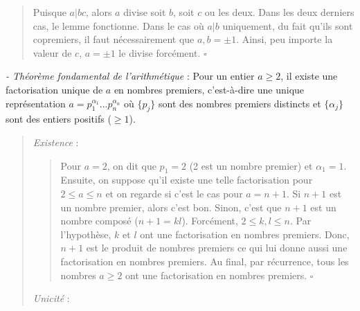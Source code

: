 \begin{quote}
    Puisque $a|bc$, alors $a$ divise soit $b$, soit $c$ ou les deux. Dans les deux derniers cas, le lemme fonctionne. Dans le cas où $a|b$ uniquement, du fait qu'ils sont copremiers, il faut nécessairement que $a,b = \pm 1$. Ainsi, peu importe la valeur de $c$, $a = \pm 1$ le divise forcément. $\square$
\end{quote}

\textit{- Théorème fondamental de l'arithmétique} : Pour un entier $a \geq 2$, il existe une factorisation unique de $a$ en nombres premiers, c'est-à-dire une unique représentation $a = p_1^{\alpha_1}...p_n^{\alpha_n}$ où $\{p_j\}$ sont des nombres premiers distincts et $\{\alpha_j\}$ sont des entiers positifs ($\geq 1$).

\begin{quote}

    \textit{Existence} :

    \begin{quote}
        Pour $a=2$, on dit que $p_1 = 2$ (2 est un nombre premier) et $\alpha_1 = 1$. Ensuite, on suppose qu'il existe une telle factorisation pour $2 \leq a \leq n$ et on regarde si c'est le cas pour $a = n+1$. Si $n+1$ est un nombre premier, alors c'est bon. Sinon, c'est que $n+1$ est un nombre composé ($n+1 = kl$). Forcément, $2 \leq k,l \leq n$. Par l'hypothèse, $k$ et $l$ ont une factorisation en nombres premiers. Donc, $n+1$ est le produit de nombres premiers ce qui lui donne aussi une factorisation en nombres premiers. Au final, par récurrence, tous les nombres $a \geq 2$ ont une factorisation en nombres premiers. $\square$
    \end{quote}

    \textit{Unicité} : 


\end{quote}
